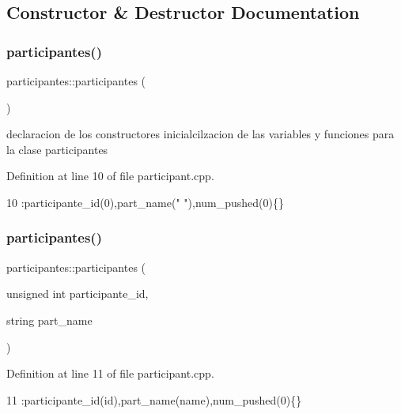 \subsection{Constructor \& Destructor Documentation}
\mbox{\label{classparticipantes_ac95bc17bd08e136d953af333d36a3930}} 
\subsubsection{\texorpdfstring{participantes()}{participantes()}\hspace{0.1cm}{\footnotesize\ttfamily [1/2]}}
{\footnotesize\ttfamily participantes\+::participantes (\begin{DoxyParamCaption}{ }\end{DoxyParamCaption})}

declaracion de los constructores inicialcilzacion de las variables y funciones para la clase participantes 

Definition at line 10 of file participant.\+cpp.


\begin{DoxyCode}
10 :participante\_id(0),part\_name(\textcolor{stringliteral}{" "}),num\_pushed(0)\{\}
\end{DoxyCode}
\mbox{\label{classparticipantes_ab5fb3ef09a7754876e365fef81a786d8}} 
\subsubsection{\texorpdfstring{participantes()}{participantes()}\hspace{0.1cm}{\footnotesize\ttfamily [2/2]}}
{\footnotesize\ttfamily participantes\+::participantes (\begin{DoxyParamCaption}\item[{unsigned int}]{participante\+\_\+id,  }\item[{string}]{part\+\_\+name }\end{DoxyParamCaption})}



Definition at line 11 of file participant.\+cpp.


\begin{DoxyCode}
11 :participante\_id(\textcolor{keywordtype}{id}),part\_name(name),num\_pushed(0)\{\}         
\end{DoxyCode}


